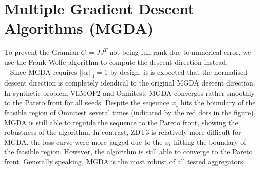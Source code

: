 \documentclass{article}
\renewcommand{\|}{\biggr|}
\begin{document}
    \section{Multiple Gradient Descent Algorithms (MGDA)}
    To prevent the Gramian $G = JJ^T$ not being full rank due to numerical error, we use the Frank-Wolfe algorithm to compute the descent direction instead.\\
    ~
    Since MGDA requires $||\alpha||_1 = 1$ by design, it is expected that the normalised descent direction is completely idendical to the original MGDA descent direction.\\
    In synthetic problem VLMOP2 and Omnitest, MGDA converges rather smoothly to the Pareto front for all seeds. Despite the seqeunce $x_t$ hits the boundary of the feasible region of Omnitest several times (indicated by the red dots in the figure), MGDA is still able to reguide the sequence to the Pareto front, showing the robustness of the algorithm. In contrast, ZDT3 is relatively more difficult for MGDA, the loss curve were more jagged due to the $x_t$ hitting the boundary of the feasible region. However, the algorithm is still able to converge to the Pareto front. Generally speaking, MGDA is the most robust of all tested aggregators.\\
\end{document}

